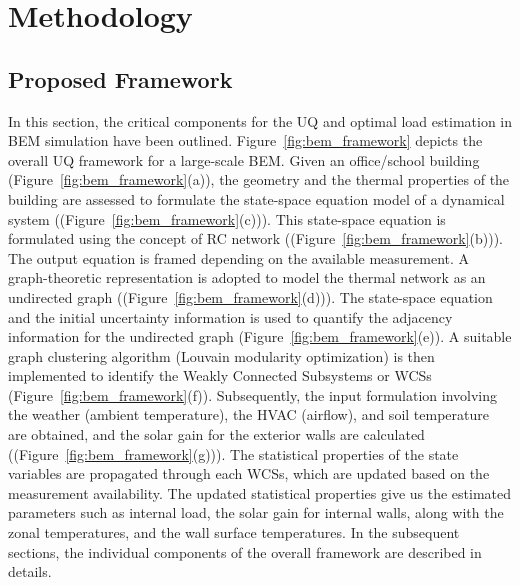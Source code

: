 \section{Methodology}

\subsection{Proposed Framework}

In this section, the critical components for the UQ and optimal load estimation in BEM simulation have been outlined. Figure~\ref{fig:bem_framework} depicts the overall UQ framework for a large-scale BEM. Given an office/school building (Figure~\ref{fig:bem_framework}(a)), the geometry and the thermal properties of the building  are assessed to formulate the state-space equation model of a dynamical system ((Figure~\ref{fig:bem_framework}(c))). This state-space equation is formulated using the concept of RC network ((Figure~\ref{fig:bem_framework}(b))). The output equation is framed depending on the available measurement. A graph-theoretic representation is adopted to model the thermal network as an undirected graph ((Figure~\ref{fig:bem_framework}(d))). The state-space equation and the initial uncertainty information is used to quantify the adjacency information for the undirected graph (Figure~\ref{fig:bem_framework}(e)). A suitable graph clustering algorithm (Louvain modularity optimization) is then implemented to identify the Weakly Connected Subsystems or WCSs (Figure~\ref{fig:bem_framework}(f)). Subsequently, the input formulation involving the weather (ambient temperature), the HVAC (airflow), and soil temperature are obtained, and the solar gain for the exterior walls are calculated ((Figure~\ref{fig:bem_framework}(g))). The statistical properties of the state variables are propagated through each WCSs, which are updated based on the measurement availability. The updated statistical properties give us the estimated parameters such as internal load, the solar gain for internal walls, along with the zonal temperatures, and the wall surface temperatures. In the subsequent sections, the individual components of the overall framework are described in details. 

